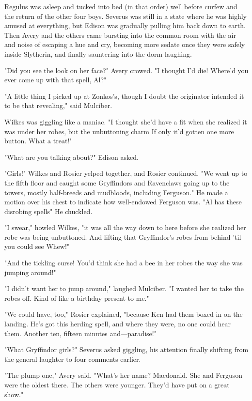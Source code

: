 Regulus was asleep and tucked into bed (in that order) well before curfew and the return of the other four boys. Severus was still in a state where he was highly amused at everything, but Edison was gradually pulling him back down to earth. Then Avery and the others came bursting into the common room with the air and noise of escaping a hue and cry, becoming more sedate once they were safely inside Slytherin, and finally sauntering into the dorm laughing.

"Did you see the look on her face?" Avery crowed. "I thought I'd die! Where'd you ever come up with that spell, Al?"

"A little thing I picked up at Zonkos's, though I doubt the originator intended it to be that{\el} revealing," said Mulciber.

Wilkes was giggling like a maniac. "I thought she'd have a fit when she realized it was under her robes, but the unbuttoning charm{\el} If only it'd gotten one more button. What a treat!"

"What are you talking about?" Edison asked.

"Girls!" Wilkes and Rosier yelped together, and Rosier continued. "We went up to the fifth floor and caught some Gryffindors and Ravenclaws going up to the towers, mostly half-breeds and mudbloods, including Ferguson." He made a motion over his chest to indicate how well-endowed Ferguson was. "Al has these disrobing spells{\el}" He chuckled.

"I swear," howled Wilkes, "it was all the way down to here before she realized her robe was being unbuttoned. And lifting that Gryffindor's robes from behind 'til you could see{\el} Whew!"

"And the tickling curse! You'd think she had a bee in her robes the way she was jumping around!"

"I didn't want her to jump around," laughed Mulciber. "I wanted her to take the robes off. Kind of like a birthday present to me."

"We could have, too," Rosier explained, "because Ken had them boxed in on the landing. He's got this herding spell, and where they were, no one could hear them. Another ten, fifteen minutes and—paradise!"

"What Gryffindor girls?" Severus asked giggling, his attention finally shifting from the general laughter to four comments earlier.

"The plump one," Avery said. "What's her name? Macdonald. She and Ferguson were the oldest there. The others were younger. They'd have put on a great show."

